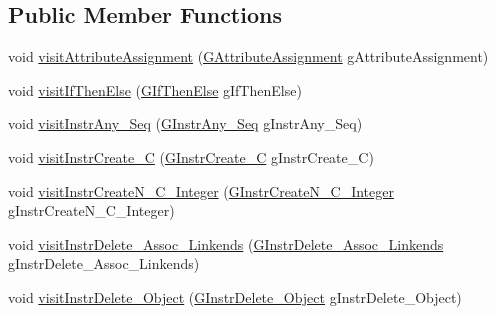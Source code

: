 \subsection*{Public Member Functions}
\begin{DoxyCompactItemize}
\item 
void \hyperlink{interfaceorg_1_1tzi_1_1use_1_1gen_1_1assl_1_1statics_1_1_instruction_visitor_a448090d3bb3f2a4437a1c0ce51ed6b57}{visit\-Attribute\-Assignment} (\hyperlink{classorg_1_1tzi_1_1use_1_1gen_1_1assl_1_1statics_1_1_g_attribute_assignment}{G\-Attribute\-Assignment} g\-Attribute\-Assignment)
\item 
void \hyperlink{interfaceorg_1_1tzi_1_1use_1_1gen_1_1assl_1_1statics_1_1_instruction_visitor_a2ff8faf75f4dea0bad0170240b081a80}{visit\-If\-Then\-Else} (\hyperlink{classorg_1_1tzi_1_1use_1_1gen_1_1assl_1_1statics_1_1_g_if_then_else}{G\-If\-Then\-Else} g\-If\-Then\-Else)
\item 
void \hyperlink{interfaceorg_1_1tzi_1_1use_1_1gen_1_1assl_1_1statics_1_1_instruction_visitor_aa8ea1e37876b355752246ab8081f00cc}{visit\-Instr\-Any\-\_\-\-Seq} (\hyperlink{classorg_1_1tzi_1_1use_1_1gen_1_1assl_1_1statics_1_1_g_instr_any___seq}{G\-Instr\-Any\-\_\-\-Seq} g\-Instr\-Any\-\_\-\-Seq)
\item 
void \hyperlink{interfaceorg_1_1tzi_1_1use_1_1gen_1_1assl_1_1statics_1_1_instruction_visitor_a1441b172bec94c4d80467a4eae49f972}{visit\-Instr\-Create\-\_\-\-C} (\hyperlink{classorg_1_1tzi_1_1use_1_1gen_1_1assl_1_1statics_1_1_g_instr_create___c}{G\-Instr\-Create\-\_\-\-C} g\-Instr\-Create\-\_\-\-C)
\item 
void \hyperlink{interfaceorg_1_1tzi_1_1use_1_1gen_1_1assl_1_1statics_1_1_instruction_visitor_a1f6abb1d5b5158f6479aedb7aaaef0e1}{visit\-Instr\-Create\-N\-\_\-\-C\-\_\-\-Integer} (\hyperlink{classorg_1_1tzi_1_1use_1_1gen_1_1assl_1_1statics_1_1_g_instr_create_n___c___integer}{G\-Instr\-Create\-N\-\_\-\-C\-\_\-\-Integer} g\-Instr\-Create\-N\-\_\-\-C\-\_\-\-Integer)
\item 
void \hyperlink{interfaceorg_1_1tzi_1_1use_1_1gen_1_1assl_1_1statics_1_1_instruction_visitor_a640dade820cdb2a6d5a5458183dea247}{visit\-Instr\-Delete\-\_\-\-Assoc\-\_\-\-Linkends} (\hyperlink{classorg_1_1tzi_1_1use_1_1gen_1_1assl_1_1statics_1_1_g_instr_delete___assoc___linkends}{G\-Instr\-Delete\-\_\-\-Assoc\-\_\-\-Linkends} g\-Instr\-Delete\-\_\-\-Assoc\-\_\-\-Linkends)
\item 
void \hyperlink{interfaceorg_1_1tzi_1_1use_1_1gen_1_1assl_1_1statics_1_1_instruction_visitor_a0e865124cd757ff85cdd844f99c06d58}{visit\-Instr\-Delete\-\_\-\-Object} (\hyperlink{classorg_1_1tzi_1_1use_1_1gen_1_1assl_1_1statics_1_1_g_instr_delete___object}{G\-Instr\-Delete\-\_\-\-Object} g\-Instr\-Delete\-\_\-\-Object)

\end{DoxyCompactItemize}

